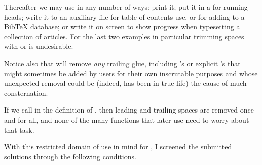Thereafter we may use \cmd{\savedtitle} in any number of ways: print it; put
it in a \cmd{\mark} for running heads; write it to an auxiliary file for
table of contents use, or for adding to a BibTeX database; or write it
on screen to show progress when typesetting a collection of articles.
For the last two examples in particular trimming spaces with
\cmd{\ignorespaces} or \cmd{\unskip} is undesirable.

Notice also that \cmd{\unskip} will remove \emph{any} trailing glue, including
\cmd{\leader}'s or explicit \cmd{\hskip}'s that might sometimes be added by
users for their own inscrutable purposes and whose unexpected
removal could be (indeed, has been in true life) the cause of
much consternation.

If we call \cmd{\trimspaces} in the definition of \cmd{\title}, then leading and
trailing spaces are removed once and for all, and none of the many
functions that later use \cmd{\savedtitle} need to worry about that task.

With this restricted domain of use in mind for \cmd{\trimspaces}, I screened
the submitted solutions through the following conditions.


